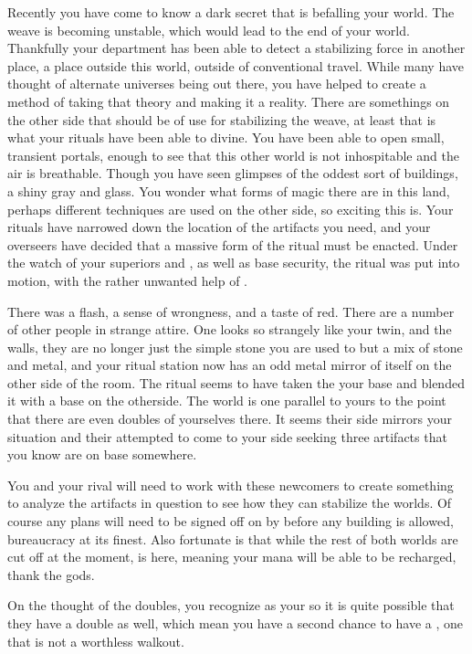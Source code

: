 \documentclass[char]{guildcamp3}
\begin{document}
Recently you have come to know a dark secret that is befalling your world. The weave is becoming unstable, which would lead to the end of your world. Thankfully your department has been able to detect a stabilizing force in another place, a place outside this world, outside of conventional travel. While many have thought of alternate universes being out there, you have helped to create a method of taking that theory and making it a reality. There are somethings on the other side that should be of use for stabilizing the weave, at least that is what your rituals have been able to divine. You have been able to open small, transient portals, enough to see that this other world is not inhospitable and the air is breathable. Though you have seen glimpses of the oddest sort of buildings, a shiny gray and glass. You wonder what forms of magic there are in this land, perhaps different techniques are used on the other side, so exciting this is. Your rituals have narrowed down the location of the artifacts you need, and your overseers have decided that a massive form of the ritual must be enacted. Under the watch of your superiors \cNobleOne{\intro} and \cNobleTwo{\intro}, as well as base security, the ritual was put into motion, with the rather unwanted help of \cMageTwo{}. 

There was a flash, a sense of wrongness, and a taste of red. There are a number of other people in strange attire. One looks so strangely like your twin, and the walls, they are no longer just the simple stone you are used to but a mix of stone and metal, and your ritual station now has an odd metal mirror of itself on the other side of the room. The ritual seems to have taken the your base and blended it with a base on the otherside. The world is one parallel to yours to the point that there are even doubles of yourselves there. It seems their side mirrors your situation and their attempted to come to your side seeking three artifacts that you know are on base somewhere. 

You and your rival will need to work with these newcomers to create something to analyze the artifacts in question to see how they can stabilize the worlds. Of course any plans will need to be signed off on by \cNobleTwo{} before any building is allowed, bureaucracy at its finest. Also fortunate is that while the rest of both worlds are cut off at the moment, \cPaladin{} is here, meaning your mana will be able to be recharged, thank the gods.

On the thought of the doubles, you recognize \cRogueTwo{\intro} as your \cRogueTwo{\parent} so it is quite possible that they have a double as well, which mean you have a second chance to have a \cRogueTwo{\parent}, one that is not a worthless walkout. 
\end{document}
